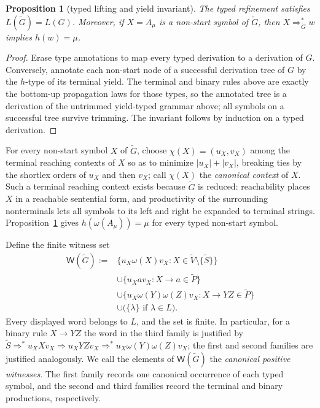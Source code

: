 \documentclass[11pt,a4paper]{article}
\newtheorem{proposition}[theorem]{Proposition}
\theoremstyle{remark}
\theoremstyle{plain}
\newcommand{\WitnessSet}{\mathsf{W}}
\begin{document}
\begin{proposition}[typed lifting and yield invariant]\label{prop:typed-core}
The typed refinement satisfies $L(\widetilde G)=L(G)$.  Moreover, if
$X=A_\mu$ is a non-start symbol of $\widetilde G$, then
$X\Rightarrow_{\widetilde G}^*w$ implies $h(w)=\mu$.
\end{proposition}
\begin{proof}
Erase type annotations to map every typed derivation to a derivation of $G$.
Conversely, annotate each non-start node of a successful derivation tree of
$G$ by the $h$-type of its terminal yield.  The terminal and binary rules
above are exactly the bottom-up propagation laws for those types, so the
annotated tree is a derivation of the untrimmed yield-typed grammar above;
all symbols on a successful tree survive trimming.  The invariant follows by induction on a
typed derivation.
\end{proof}

For every non-start symbol $X$ of $\widetilde G$, choose
$\chi(X)=(u_X,v_X)$ among the terminal reaching contexts of $X$ so as to
minimize $|u_X|+|v_X|$, breaking ties by the shortlex orders of $u_X$ and
then $v_X$; call $\chi(X)$ the \emph{canonical context} of $X$.  Such a
terminal reaching context exists because $\widetilde G$ is reduced:
reachability places $X$ in a reachable sentential form, and productivity of
the surrounding nonterminals lets all symbols to its left and right be
expanded to terminal strings.  Proposition~\ref{prop:typed-core} gives
$h(\omega(A_\mu))=\mu$ for every typed non-start symbol.

Define the finite witness set
\begin{equation}\label{eq:W}
\begin{split}
\WitnessSet(\widetilde G):={}&
 \{u_X\omega(X)v_X:X\in\widetilde V\setminus\{\widetilde S\}\}\\
&\cup\{u_Xav_X:X\to a\in\widetilde P\}\\
&\cup\{u_X\omega(Y)\omega(Z)v_X:X\to YZ\in\widetilde P\}\\
&\cup\bigl(\{\lambda\}\text{ if }\lambda\in L\bigr).
\end{split}
\end{equation}
Every displayed word belongs to $L$, and the set is finite.  In particular,
for a binary rule $X\to YZ$ the word in the third family is justified by
$\widetilde S\Rightarrow^*u_XXv_X\Rightarrow u_XYZv_X
\Rightarrow^*u_X\omega(Y)\omega(Z)v_X$; the first and second families are
justified analogously.  We call the elements of $\WitnessSet(\widetilde G)$
the \emph{canonical positive witnesses}.  The first family records one
canonical occurrence of each typed symbol, and the second and third families
record the terminal and binary productions, respectively.
\end{document}
